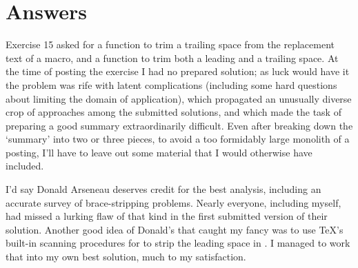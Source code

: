 \begin{comment}
Send answers to the address below. A summary will be posted
November 23, 1993 or thereabouts.

Michael Downes %
mjd@math.ams.org (Internet) ASCII 32--54,55--126: !"#$%
789:;<=>?@ABCDEFGHIJKLMNOPQRSTUVWXYZ[\]^_`abcdefghijklmnopqrstuvwxyz{|}~
\end{comment}


\section{Answers}

\begin{comment}
[The four parts of this answer were originally posted separately, as
indicated in the subject lines.]

Date: 16 Dec 1993 16:34:45 -0500 (EST)
From: Michael Downes <MJD@MATH.AMS.ORG>
Subject: Around the Bend #15, answers
To: info-tex@shsu.edu
\end{comment}


Exercise 15 asked for a function \cmd{\trimspace} to trim a trailing space
from the replacement text of a macro, and a function \cmd{\trimspaces} to
trim both a leading and a trailing space. At the time of posting the
exercise I had no prepared solution; as luck would have it the problem
was rife with latent complications (including some hard questions
about limiting the domain of application), which propagated an
unusually diverse crop of approaches among the submitted solutions,
and which made the task of preparing a good summary extraordinarily
difficult. Even after breaking down the `summary' into two or three
pieces, to avoid a too formidably large monolith of a posting, I'll
have to leave out some material that I would otherwise have included.

I'd say Donald Arseneau deserves credit for 
the best analysis,
including an accurate survey of brace-stripping problems. Nearly
everyone, including myself, had missed a lurking flaw of that kind in
the first submitted version of their solution. Another good idea of
Donald's that caught my fancy was to use TeX's built-in scanning
procedures for  to strip the leading space in
\cmd{\trimspaces}. I managed to work that into my own best solution, much to
my satisfaction.

